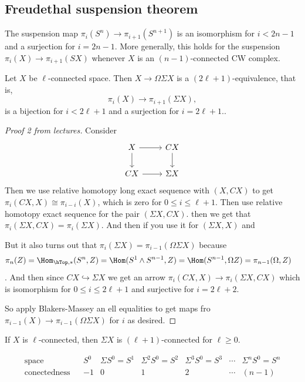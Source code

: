 \begin{remark}
\subsection{Freudethal suspension theorem}

\begin{coro}
	The suspension map $\pi_{i}(S^{n})\to \pi_{i+1}(S^{n+1})$ is an isomorphism for $i<2n-1$ and a surjection for $i=2n-1$. More generally, this holds for the suspension $\pi_{i}(X)\to \pi_{i+1}(SX)$ whenever $X$ is an $(n-1)$-connected CW complex.
\end{coro}
\begin{thm}
		Let $X$ be $\ell$-connected space. Then $X\to\Omega\Sigma X$ is a $(2\ell+1)$-equivalence, that is,
	\[\pi_i(X)\to \pi_{i+1}(\Sigma X),\]
	is a bijection for $i<2\ell+1$ and a surjection for $i=2\ell+1$..
\end{thm}
\begin{proof}[Proof 2 from lectures]
	Consider
	\[\begin{tikzcd}
		X\arrow[r]\arrow[d]&CX\arrow[d]\\
		CX\arrow[r]&\Sigma X
	\end{tikzcd}\]
	Then we use relative homotopy long exact sequence with $(X,CX)$ to get $\pi_i(CX,X)\cong\pi_{i-i}(X)$, which is zero for $0\leq i\leq \ell+1$. Then use relative homotopy exact sequence for the pair $(\Sigma X,CX)$. then we get that $\pi_i(\Sigma X,CX)=\pi_i(\Sigma X)$. And then if you use it for $(\Sigma X, X)$ and 
	
	But it also turns out that $\pi_i(\Sigma X)=\pi_{i-1}(\Omega\Sigma X)$ because
	\begin{align*}
		\pi_n(Z)&=\Hom_{\hTop,*}(S^n,Z)=\Hom(S^1\wedge S^{n-1},Z)=\Hom(S^{n-1},\Omega Z)=\pi_{n-1}(\Omega,Z)
	\end{align*}.
	And then since $CX\hookrightarrow \Sigma X$ we get an arrow $\pi_i(CX,X)\to\pi_i(\Sigma X,CX)$ which is isomorphism for $0\leq i \leq 2\ell +1$ and surjective for $i=2\ell+2$.
	
	So apply Blakers-Massey an ell equalities to get maps fro $\pi_{i-1}(X)\to\pi_{i-1}(\Omega\Sigma X)$ for $i$ as desired.
\end{proof}
\begin{coro}
	If $X$ is $\ell$-connected, then $\Sigma X$ is $(\ell+1)$-connected for $\ell\geq0$.
\end{coro}
\[\begin{matrix}
	\text{space}&&S^0&\Sigma S^0=S^1&\Sigma^2S^0=S^2&\Sigma^3S^0=S^3&\cdots&\Sigma^nS^0=S^n\\
	\text{conectedness}&&-1&0&1&2&\cdots&(n-1)
\end{matrix}\]


\end{remark}
